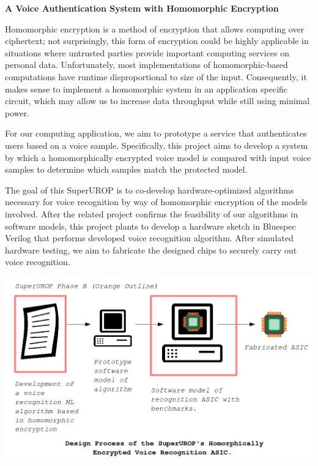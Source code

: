 \documentclass[11pt]{article}
\begin{document}
\textbf{A Voice Authentication System with Homomorphic Encryption}

Homomorphic encryption is a method of encryption that allows computing over ciphertext; not surprisingly, this form of encryption could be highly applicable in situations where untrusted parties provide important computing services on personal data. Unfortunately, most implementations of homomorphic-based computations have runtime disproportional to size of the input. Consequently, it makes sense to implement a homomorphic system in an application specific circuit, which may allow us to increase data throughput while still using minimal power.

For our computing application, we aim to prototype a service that authenticates users based on a voice sample. Specifically, this project aims to develop a system by which a homomorphically encrypted voice model is compared with input voice samples to determine which samples match the protected model.

The goal of this SuperUROP is to co-develop hardware-optimized algorithms necessary for voice recognition by way of homomorphic encryption of the models involved. After the related project confirms the feasibility of our algorithms in software models, this project plants to develop a hardware sketch in Bluespec Verilog that performs developed voice recognition algorithm. After simulated hardware testing, we aim to fabricate the designed chips to securely carry out voice recognition.

\begin{center}
\includegraphics[scale=0.3]{skoppula-picture-2.jpg}
\end{center}
\end{document}
